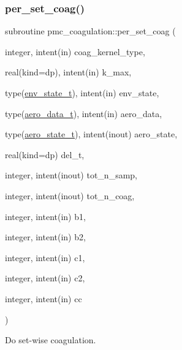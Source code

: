 \subsubsection{\texorpdfstring{per\+\_\+set\+\_\+coag()}{per\_set\_coag()}}
{\footnotesize\ttfamily subroutine pmc\+\_\+coagulation\+::per\+\_\+set\+\_\+coag (\begin{DoxyParamCaption}\item[{integer, intent(in)}]{coag\+\_\+kernel\+\_\+type,  }\item[{real(kind=dp), intent(in)}]{k\+\_\+max,  }\item[{type(\mbox{\hyperlink{structpmc__env__state_1_1env__state__t}{env\+\_\+state\+\_\+t}}), intent(in)}]{env\+\_\+state,  }\item[{type(\mbox{\hyperlink{structpmc__aero__data_1_1aero__data__t}{aero\+\_\+data\+\_\+t}}), intent(in)}]{aero\+\_\+data,  }\item[{type(\mbox{\hyperlink{structpmc__aero__state_1_1aero__state__t}{aero\+\_\+state\+\_\+t}}), intent(inout)}]{aero\+\_\+state,  }\item[{real(kind=dp)}]{del\+\_\+t,  }\item[{integer, intent(inout)}]{tot\+\_\+n\+\_\+samp,  }\item[{integer, intent(inout)}]{tot\+\_\+n\+\_\+coag,  }\item[{integer, intent(in)}]{b1,  }\item[{integer, intent(in)}]{b2,  }\item[{integer, intent(in)}]{c1,  }\item[{integer, intent(in)}]{c2,  }\item[{integer, intent(in)}]{cc }\end{DoxyParamCaption})}



Do set-\/wise coagulation. 


